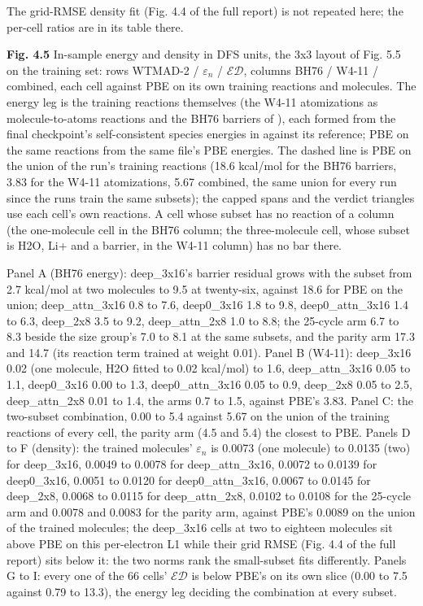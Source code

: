 \documentclass[10pt,a4paper]{article}
\begin{document}
The grid-RMSE density fit (Fig. 4.4 of the full report) is not repeated here; the per-cell ratios are in its table there.

\textbf{Fig. 4.5} In-sample energy and density in DFS units, the 3x3 layout of Fig. 5.5 on the training set: rows WTMAD-2 / $\varepsilon_n$ / $\mathcal{ED}$, columns BH76 / W4-11 / combined, each cell against PBE on its own training reactions and molecules. The energy leg is the training reactions themselves (the W4-11 atomizations as molecule-to-atoms reactions and the BH76 barriers of ), each formed from the final checkpoint's self-consistent species energies in  against its reference; PBE on the same reactions from the same file's PBE energies. The dashed line is PBE on the union of the run's training reactions (18.6 kcal/mol for the BH76 barriers, 3.83 for the W4-11 atomizations, 5.67 combined, the same union for every run since the runs train the same subsets); the capped spans and the verdict triangles use each cell's own reactions. A cell whose subset has no reaction of a column (the one-molecule cell in the BH76 column; the three-molecule cell, whose subset is H2O, Li+ and a barrier, in the W4-11 column) has no bar there.

Panel A (BH76 energy): deep\_3x16's barrier residual grows with the subset from 2.7 kcal/mol at two molecules to 9.5 at twenty-six, against 18.6 for PBE on the union; deep\_attn\_3x16 0.8 to 7.6, deep0\_3x16 1.8 to 9.8, deep0\_attn\_3x16 1.4 to 6.3, deep\_2x8 3.5 to 9.2, deep\_attn\_2x8 1.0 to 8.8; the 25-cycle arm 6.7 to 8.3 beside the size group's 7.0 to 8.1 at the same subsets, and the parity arm 17.3 and 14.7 (its reaction term trained at weight 0.01). Panel B (W4-11): deep\_3x16 0.02 (one molecule, H2O fitted to 0.02 kcal/mol) to 1.6, deep\_attn\_3x16 0.05 to 1.1, deep0\_3x16 0.00 to 1.3, deep0\_attn\_3x16 0.05 to 0.9, deep\_2x8 0.05 to 2.5, deep\_attn\_2x8 0.01 to 1.4, the arms 0.7 to 1.5, against PBE's 3.83. Panel C: the two-subset combination, 0.00 to 5.4 against 5.67 on the union of the training reactions of every cell, the parity arm (4.5 and 5.4) the closest to PBE. Panels D to F (density): the trained molecules' $\varepsilon_n$ is 0.0073 (one molecule) to 0.0135 (two) for deep\_3x16, 0.0049 to 0.0078 for deep\_attn\_3x16, 0.0072 to 0.0139 for deep0\_3x16, 0.0051 to 0.0120 for deep0\_attn\_3x16, 0.0067 to 0.0145 for deep\_2x8, 0.0068 to 0.0115 for deep\_attn\_2x8, 0.0102 to 0.0108 for the 25-cycle arm and 0.0078 and 0.0083 for the parity arm, against PBE's 0.0089 on the union of the trained molecules; the deep\_3x16 cells at two to eighteen molecules sit above PBE on this per-electron L1 while their grid RMSE (Fig. 4.4 of the full report) sits below it: the two norms rank the small-subset fits differently. Panels G to I: every one of the 66 cells' $\mathcal{ED}$ is below PBE's on its own slice (0.00 to 7.5 against 0.79 to 13.3), the energy leg deciding the combination at every subset.
\end{document}
